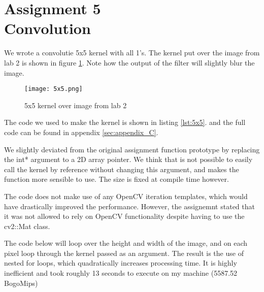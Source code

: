 \section {Assignment 5 \\ {Convolution}}
\label {sec:assignment_5}

We wrote a convolutie 5x5 kernel with all 1's. The kernel put over the image from lab 2 is shown in figure \ref{fig:5x5}. Note how the output of the filter will slightly blur the image.

\begin{figure}[h!]
    \centering
    \texttt{[image: 5x5.png]}
    \caption{5x5 kernel over image from lab 2}
    \label{fig:5x5}
\end{figure}

The code we used to make the kernel is shown in listing \ref{lst:5x5}. and the full code can be found in appendix \ref{sec:appendix_C}.

We slightly deviated from the original assignment function prototype by replacing the int* argument to a 2D array pointer. We think that is not possible to easily call the kernel by reference without changing this argument, and makes the function more sensible to use. The size is fixed at compile time however.

The code does not make use of any OpenCV iteration templates, which would have drastically improved the performance. However, the assignemnt stated that it was not allowed to rely on OpenCV functionality despite having to use the cv2::Mat class.

The code below will loop over the height and width of the image, and on each pixel loop through the kernel passed as an argument. The result is the use of nested for loops, which quadratically increases processing time. It is highly inefficient and took roughly 13 seconds to execute on my machine (5587.52 BogoMips)

